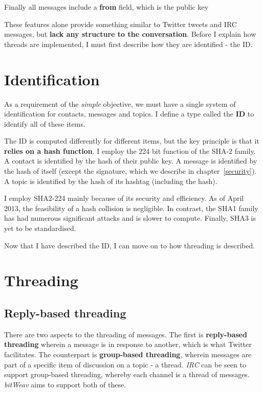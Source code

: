 \documentclass[10pt,a4paper,onecolumn]{article}
\begin{document}
Finally all messages include a \textbf{from} field, which is the public key

These features alone provide something similar to Twitter tweets and IRC messages, but \textbf{lack any structure to the conversation}. Before I explain how threads are implemented, I must first describe how they are identified - the ID.

\section{Identification}
\label{id}
As a requirement of the \emph{simple} objective, we must have a single system of identification for contacts, messages and topics. I define a type called the \textbf{ID} to identify all of these items. 

The ID is computed differently for different items, but the key principle is that it \textbf{relies on a hash function}. I employ the 224 bit function of the SHA-2 family. A contact is identified by the hash of their public key. A message is identified by the hash of itself (except the signature, which we describe in chapter~\ref{security}). A topic is identified by the hash of its hashtag (including the hash). 

I employ SHA2-224 mainly because of its security and efficiency. As of April 2013, the feasibility of a hash collision is negligible. In contrast, the SHA1 family has had numerous significant attacks and is slower to compute. Finally, SHA3 is yet to be standardised. 

Now that I have described the ID, I can move on to how threading is described.

\section{Threading}
\subsection*{Reply-based threading}
There are two aspects to the threading of messages. The first is \textbf{reply-based threading} wherein a message is in response to another, which is what Twitter facilitates. The counterpart is \textbf{group-based threading}, wherein messages are part of a specific item of discussion on a topic - a thread. \textit{IRC} can be seen to support group-based threading, whereby each channel is a thread of messages. \textit{bitWeav} aims to support both of these. 
\end{document}
